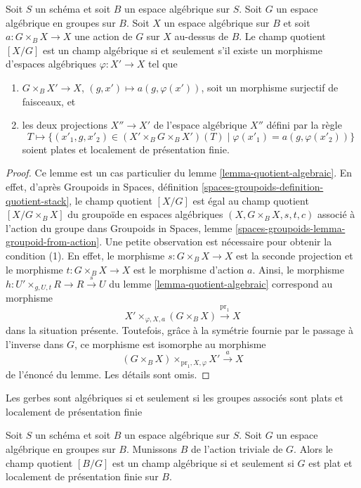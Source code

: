\begin{lemma}
\label{lemma-group-quotient-algebraic}
Soit $S$ un schéma et soit $B$ un espace algébrique sur $S$.
Soit $G$ un espace algébrique en groupes sur $B$.
Soit $X$ un espace algébrique sur $B$ et soit $a : G \times_B X \to X$
une action de $G$ sur $X$ au-dessus de $B$.
Le champ quotient $[X/G]$ est un champ algébrique si et seulement s'il
existe un morphisme d'espaces algébriques $\varphi : X' \to X$ tel que
\begin{enumerate}
\item $G \times_B X' \to X$, $(g, x') \mapsto a(g, \varphi(x'))$, soit un
morphisme surjectif de faisceaux, et
\item les deux projections $X'' \to X'$ de l'espace algébrique $X''$
défini par la règle
$$
T \longmapsto \{(x'_1, g, x'_2) \in (X' \times_B G \times_B X')(T)
\mid \varphi(x'_1) = a(g, \varphi(x'_2))\}
$$
soient plates et localement de présentation finie.
\end{enumerate}
\end{lemma}

\begin{proof}
Ce lemme est un cas particulier du
lemme \ref{lemma-quotient-algebraic}.
En effet, d'après
Groupoids in Spaces, définition \ref{spaces-groupoids-definition-quotient-stack},
le champ quotient $[X/G]$ est égal au champ quotient $[X/G \times_B X]$ du groupoïde
en espaces algébriques $(X, G \times_B X, s, t, c)$ associé à
l'action du groupe dans
Groupoids in Spaces, lemme \ref{spaces-groupoids-lemma-groupoid-from-action}.
Une petite observation est nécessaire pour obtenir la condition (1).
En effet, le morphisme $s : G \times_B X \to X$ est la seconde projection
et le morphisme $t :  G \times_B X \to X$ est le morphisme d'action $a$.
Ainsi, le morphisme $h : U' \times_{g, U, t} R \to R \xrightarrow{s} U$ du
lemme \ref{lemma-quotient-algebraic}
correspond au morphisme
$$
X' \times_{\varphi, X, a} (G \times_B X) \xrightarrow{\text{pr}_1} X
$$
dans la situation présente. Toutefois, grâce à la symétrie fournie par
le passage à l'inverse dans $G$, ce morphisme est isomorphe au morphisme
$$
(G \times_B X) \times_{\text{pr}_1, X, \varphi} X' \xrightarrow{a} X
$$
de l'énoncé du lemme. Les détails sont omis.
\end{proof}

\begin{lemma}
\label{lemma-BG-algebraic}
\begin{slogan}
Les gerbes sont algébriques si et seulement si les groupes associés sont plats
et localement de présentation finie
\end{slogan}
Soit $S$ un schéma et soit $B$ un espace algébrique sur $S$.
Soit $G$ un espace algébrique en groupes sur $B$.
Munissons $B$ de l'action triviale de $G$.
Alors le champ quotient $[B/G]$ est un champ algébrique
si et seulement si $G$ est plat et localement de présentation finie sur $B$.
\end{lemma}

